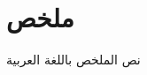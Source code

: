 \newpage
\chapter*{\textarabic{ملخص}}
\begingroup
\ArabicResumeLineSpacing
\begin{otherlanguage}{arabic}
نص الملخص باللغة العربية
\end{otherlanguage}
\endgroup
